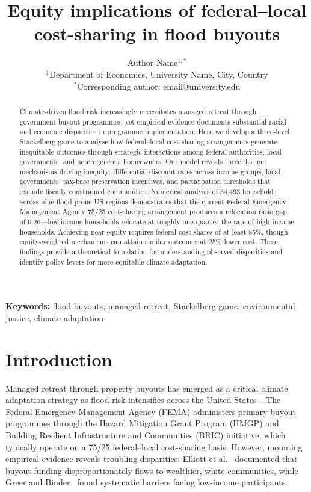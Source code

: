 \documentclass[11pt,letterpaper]{article}
\title{\Large\textbf{Equity implications of federal--local cost-sharing in flood buyouts}}
\author{
Author Name$^{1,*}$\\[0.5em]
\small $^1$Department of Economics, University Name, City, Country\\
\small $^*$Corresponding author: email@university.edu
}
\date{}
\theoremstyle{definition}
\begin{document}
\maketitle


\begin{abstract}
\noindent
Climate-driven flood risk increasingly necessitates managed retreat through government buyout programmes, yet empirical evidence documents substantial racial and economic disparities in programme implementation. Here we develop a three-level Stackelberg game to analyse how federal--local cost-sharing arrangements generate inequitable outcomes through strategic interactions among federal authorities, local governments, and heterogeneous homeowners. Our model reveals three distinct mechanisms driving inequity: differential discount rates across income groups, local governments' tax-base preservation incentives, and participation thresholds that exclude fiscally constrained communities. Numerical analysis of 34,493 households across nine flood-prone US regions demonstrates that the current Federal Emergency Management Agency 75/25 cost-sharing arrangement produces a relocation ratio gap of 0.26---low-income households relocate at roughly one-quarter the rate of high-income households. Achieving near-equity requires federal cost shares of at least 85\%, though equity-weighted mechanisms can attain similar outcomes at 25\% lower cost. These findings provide a theoretical foundation for understanding observed disparities and identify policy levers for more equitable climate adaptation.
\end{abstract}

\vspace{1em}
\noindent\textbf{Keywords:} flood buyouts, managed retreat, Stackelberg game, environmental justice, climate adaptation


\section*{Introduction}

Managed retreat through property buyouts has emerged as a critical climate adaptation strategy as flood risk intensifies across the United States~\cite{siders2019strategic, mach2019managed}. The Federal Emergency Management Agency (FEMA) administers primary buyout programmes through the Hazard Mitigation Grant Program (HMGP) and Building Resilient Infrastructure and Communities (BRIC) initiative, which typically operate on a 75/25 federal--local cost-sharing basis. However, mounting empirical evidence reveals troubling disparities: Elliott et al.~\cite{elliott2021racial} documented that buyout funding disproportionately flows to wealthier, white communities, while Greer and Binder~\cite{greer2021political} found systematic barriers facing low-income participants.
\end{document}
